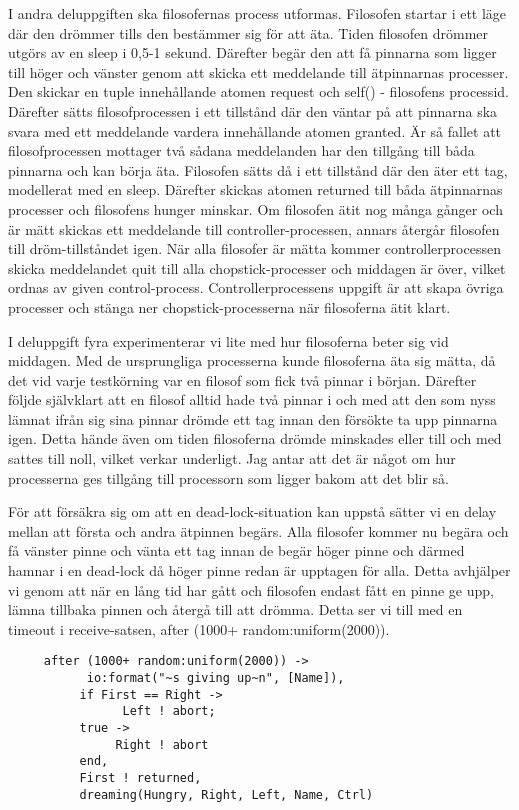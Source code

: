 \documentclass[a4paper, 11pt]{article}
\begin{document}
I andra deluppgiften ska filosofernas process utformas. Filosofen startar i ett läge där den drömmer tills den bestämmer sig för att äta. Tiden filosofen drömmer utgörs av en sleep i 0,5-1 sekund. Därefter begär den att få pinnarna som ligger till höger och vänster genom att skicka ett meddelande till ätpinnarnas processer. Den skickar en tuple innehållande atomen request och self() - filosofens processid. Därefter sätts filosofprocessen i ett tillstånd där den väntar på att pinnarna ska svara med ett meddelande vardera innehållande atomen granted. Är så fallet att filosofprocessen mottager två sådana meddelanden har den tillgång till båda pinnarna och kan börja äta. Filosofen sätts då i ett tillstånd där den äter ett tag, modellerat med en sleep. Därefter skickas atomen returned till båda ätpinnarnas processer och filosofens hunger minskar. Om filosofen ätit nog många gånger och är mätt skickas ett meddelande till controller-processen, annars återgår filosofen till dröm-tillståndet igen. När alla filosofer är mätta kommer controllerprocessen skicka meddelandet quit till alla chopstick-processer och middagen är över, vilket ordnas av given control-process. Controllerprocessens uppgift är att skapa övriga processer och stänga ner chopstick-processerna när filosoferna ätit klart.

I deluppgift fyra experimenterar vi lite med hur filosoferna beter sig vid middagen. Med de ursprungliga processerna kunde filosoferna äta sig mätta, då det vid varje testkörning var en filosof som fick två pinnar i början. Därefter följde självklart att en filosof alltid hade två pinnar i och med att den som nyss lämnat ifrån sig sina pinnar drömde ett tag innan den försökte ta upp pinnarna igen. Detta hände även om tiden filosoferna drömde minskades eller till och med sattes till noll, vilket verkar underligt. Jag antar att det är något om hur processerna ges tillgång till processorn som ligger bakom att det blir så.

För att försäkra sig om att en dead-lock-situation kan uppstå sätter vi en delay mellan att första och andra ätpinnen begärs. Alla filosofer kommer nu begära och få vänster pinne och vänta ett tag  innan de begär höger pinne och därmed hamnar i en dead-lock då höger pinne redan är upptagen för alla. Detta avhjälper vi genom att när en lång tid har gått och filosofen endast fått en pinne ge upp, lämna tillbaka pinnen och återgå till att drömma. Detta ser vi till med en timeout i receive-satsen, after (1000+ random:uniform(2000)). 
\begin{verbatim}
     after (1000+ random:uniform(2000)) ->
           io:format("~s giving up~n", [Name]),
          if First == Right ->
                Left ! abort;
          true ->
               Right ! abort
          end,
          First ! returned,
          dreaming(Hungry, Right, Left, Name, Ctrl)
\end{verbatim}
\end{document}
